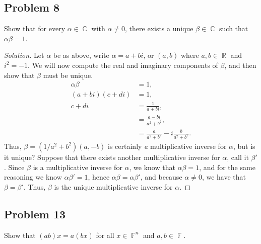 \documentclass[letterpaper, 12pt]{amsart}
\DeclareMathOperator{\R}{\mathbb{R}}
\DeclareMathOperator{\F}{\mathbb{F}}
\DeclareMathOperator{\C}{\mathbb{C}}
\theoremstyle{definition}  %
\begin{document}
		\subsection*{Problem 8}
		Show that for every $\alpha \in \C$ with $\alpha \neq 0$, there exists a unique $\beta \in \C$ such that $\alpha \beta = 1$.

		\begin{proof}[Solution]
		Let $\alpha$ be as above, write $\alpha = a + bi$, or $(a,b)$ where $a,b \in \R$ and $i^{2} = -1$.
		We will now compute the real and imaginary components of $\beta$, and then show that $\beta$ must be unique.
			\begin{align*}
			\alpha \beta &= 1, \\
			(a + bi)(c + di) &= 1, \\
			c + di &= \frac{1}{a + bi}, \\
			&= \frac{a - bi}{a^{2} + b^{2}}, \\
			&= \frac{a}{a^{2} + b^{2}} - i\frac{b}{a^{2} + b^{2}}.
			\end{align*}
		Thus, $\beta = (1/a^{2} + b^{2})(a,-b)$ is certainly \textit{a} multiplicative inverse for $\alpha$, but is it unique?
		Suppose that there exists another multiplicative inverse for $\alpha$, call it $\beta'$.
		Since $\beta$ is a multiplicative inverse for $\alpha$, we know that $\alpha \beta = 1$, and for the same reasoning we know $\alpha \beta' = 1$, hence $\alpha \beta = \alpha \beta'$, and because $\alpha \neq 0$, we have that $\beta = \beta'$.
		Thus, $\beta$ is the unique multiplicative inverse for $\alpha$.	
		\end{proof}

		\subsection*{Problem 13}
		Show that $(ab)x = a(bx)$ for all $x \in \F^{n}$ and $a,b \in \F$.
\end{document}
